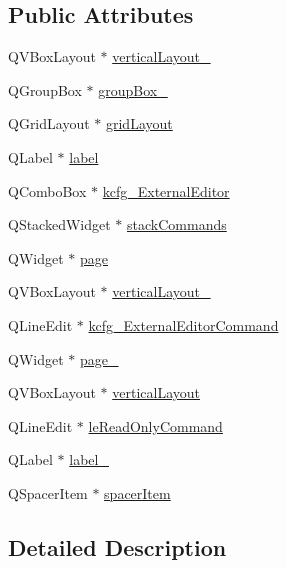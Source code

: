 \subsection*{Public Attributes}
\begin{DoxyCompactItemize}
\item 
Q\+V\+Box\+Layout $\ast$ \hyperlink{classUi__DlgEditorBase_aead893366975b549c973d84baabe2582}{vertical\+Layout\+\_}
\item 
Q\+Group\+Box $\ast$ \hyperlink{classUi__DlgEditorBase_ac29bd679e8fa10b5cc21c9db0015ef32}{group\+Box\+\_}
\item 
Q\+Grid\+Layout $\ast$ \hyperlink{classUi__DlgEditorBase_a00e2ad664672aefcb22d0f5db12ead6e}{grid\+Layout}
\item 
Q\+Label $\ast$ \hyperlink{classUi__DlgEditorBase_a678b5c63f8a18e14b1c4ddb8cc24ff73}{label}
\item 
Q\+Combo\+Box $\ast$ \hyperlink{classUi__DlgEditorBase_aea3d3090a97b8e3074b1e571713a9510}{kcfg\+\_\+\+External\+Editor}
\item 
Q\+Stacked\+Widget $\ast$ \hyperlink{classUi__DlgEditorBase_ac8d26dfb80345007e7902493c10381bc}{stack\+Commands}
\item 
Q\+Widget $\ast$ \hyperlink{classUi__DlgEditorBase_af3b7d22dff970a6addbde47573ff7266}{page}
\item 
Q\+V\+Box\+Layout $\ast$ \hyperlink{classUi__DlgEditorBase_ad8868a913a9bd13bd8d15ccd9a4c3604}{vertical\+Layout\+\_}
\item 
Q\+Line\+Edit $\ast$ \hyperlink{classUi__DlgEditorBase_a6123d3afc7b3db52828306e0c4de3e2d}{kcfg\+\_\+\+External\+Editor\+Command}
\item 
Q\+Widget $\ast$ \hyperlink{classUi__DlgEditorBase_a1fd95e634b45303a8580b0eca4673f10}{page\+\_}
\item 
Q\+V\+Box\+Layout $\ast$ \hyperlink{classUi__DlgEditorBase_af052bff89434f8bc9020fb73fd68e5b3}{vertical\+Layout}
\item 
Q\+Line\+Edit $\ast$ \hyperlink{classUi__DlgEditorBase_a2ad0da3e2f36dbf17c67fb029a0e0f75}{le\+Read\+Only\+Command}
\item 
Q\+Label $\ast$ \hyperlink{classUi__DlgEditorBase_a814dc80e48575b71fb8f04b4cb05c199}{label\+\_}
\item 
Q\+Spacer\+Item $\ast$ \hyperlink{classUi__DlgEditorBase_a7bd5cb1eceba6fb9806f259a2b3c0a5c}{spacer\+Item}
\end{DoxyCompactItemize}


\subsection{Detailed Description}


